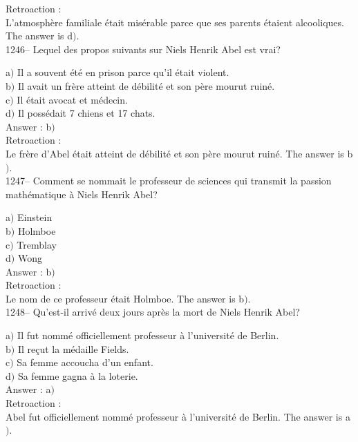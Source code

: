 ﻿\documentclass[letterpaper, 12pt]{article}
\begin{document}
Retroaction : \\
L'atmosph\`ere familiale \'etait mis\'erable parce que ses parents
\'etaient alcooliques.
The answer is d$)$.\\

1246-- Lequel des propos suivants sur Niels Henrik Abel est vrai?

a$)$ Il a souvent \'et\'e en prison parce qu'il \'etait violent. \\
b$)$ Il avait un fr\`ere atteint de d\'ebilit\'e et son p\`ere mourut
ruin\'e. \\
c$)$ Il \'etait avocat et m\'edecin. \\
d$)$ Il poss\'edait 7 chiens et 17 chats.  \\

Answer : b$)$\\

Retroaction : \\
Le fr\`ere d'Abel \'etait atteint de d\'ebilit\'e et son p\`ere
mourut ruin\'e.
The answer is b$)$.\\

1247-- Comment se nommait le professeur de sciences qui transmit la
passion math\'ematique \`a Niels Henrik Abel?

a$)$ Einstein \\
b$)$ Holmboe \\
c$)$ Tremblay \\
d$)$ Wong\\

Answer : b$)$\\

Retroaction : \\
Le nom de ce professeur \'etait Holmboe.
The answer is b$)$.\\

1248-- Qu'est-il arriv\'e deux jours apr\`es la mort de Niels Henrik
Abel?

a$)$ Il fut nomm\'e officiellement professeur \`a l'universit\'e de Berlin.
\\
b$)$ Il re\c cut la m\'edaille Fields. \\
c$)$ Sa femme accoucha d'un enfant. \\
d$)$ Sa femme gagna \`a la loterie.\\

Answer : a$)$\\

Retroaction : \\
Abel fut officiellement nomm\'e professeur \`a l'universit\'e de
Berlin.
The answer is a$)$.\\
\end{document}
